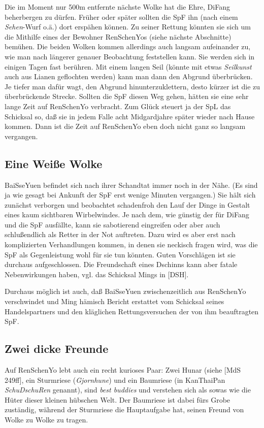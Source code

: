 \documentclass[
a4paper,
twoside,
DIV=calc,
BCOR=4mm,
fontsize=9pt,
twocolumn=on,
titlepage=on,
parskip=half
]{scrartcl}
\begin{document}
Die im Moment nur 500m entfernte nächste Wolke hat die Ehre, DiFang
beherbergen zu dürfen. Früher oder später sollten die SpF ihn (nach
einem \emph{Sehen}-Wurf o.ä.) dort erspähen können. Zu seiner Rettung
könnten sie sich um die Mithilfe eines der Bewohner RenSchenYos (siehe
nächste Abschnitte) bemühen. Die beiden Wolken kommen allerdings auch
langsam aufeinander zu, wie man nach längerer genauer Beobachtung
feststellen kann. Sie werden sich in einigen Tagen fast berühren. Mit
einem langen Seil (könnte mit etwas \emph{Seilkunst} auch aus Lianen
geflochten werden) kann man dann den Abgrund überbrücken. Je tiefer
man dafür wagt, den Abgrund hinunterzuklettern, desto kürzer ist die
zu überbrückende Strecke. Sollten die SpF diesen Weg gehen, hätten sie
eine sehr lange Zeit auf RenSchenYo verbracht. Zum Glück steuert ja
der SpL das Schicksal so, daß sie in jedem Falle acht Midgardjahre
später wieder nach Hause kommen. Dann ist die Zeit auf RenSchenYo eben
doch nicht ganz so langsam vergangen.

\subsection{Eine Weiße Wolke}

BaiSseYuen befindet sich nach ihrer Schandtat immer noch in der
Nähe. (Es sind ja wie gesagt bei Ankunft der SpF erst wenige Minuten
vergangen.) Sie hält sich zunächst verborgen und beobachtet
schadenfroh den Lauf der Dinge in Gestalt eines kaum sichtbaren
Wirbelwindes. Je nach dem, wie günstig der für DiFang und die SpF
ausfällte, kann sie sabotierend eingreifen oder aber auch
schlußendlich als Retter in der Not auftreten. Dazu wird es aber erst
nach komplizierten Verhandlungen kommen, in denen sie neckisch fragen
wird, was die SpF als Gegenleistung wohl für sie tun könnten. Guten
Vorschlägen ist sie durchaus aufgeschlossen. Die Freundschaft eines
Dschinns kann aber fatale Nebenwirkungen haben, vgl. das Schicksal
Mings in [DSH].

Durchaus möglich ist auch, daß BaiSseYuen zwischenzeitlich aus
RenSchenYo verschwindet und Ming hämisch Bericht erstattet vom
Schicksal seines Handelspartners und den kläglichen Rettungsversuchen
der von ihm beauftragten SpF.

\subsection{Zwei dicke Freunde}
\label{hunar}

Auf RenSchenYo lebt auch ein recht kurioses Paar: Zwei Hunar (siehe
[MdS\,249ff], ein Sturmriese (\emph{Gjornhune}) und ein Baumriese (in
KanThaiPan \emph{SchuDschuRen} genannt), sind \emph{best buddies} und
verstehen sich als sowas wie die Hüter dieser kleinen hübschen
Welt. Der Baumriese ist dabei fürs Grobe zuständig, während der
Sturmriese die Hauptaufgabe hat, seinen Freund von Wolke zu Wolke zu
tragen.
\end{document}
